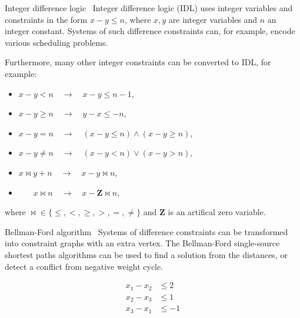\documentclass{beamer}
\begin{document}
\begin{frame}[fragile,t]
\begin{columns}[t,onlytextwidth]
\begin{column}{0.485\textwidth}
		\begin{block}{Integer difference logic~\cite{slides}}
			Integer difference logic (IDL) uses integer variables and constraints in the form $x - y \leq n$, where $x, y$ are integer variables and $n$ an integer constant. Systems of such difference constraints can, for example, encode various scheduling problems.
			
			Furthermore, many other integer constraints can be converted to IDL, for example:
			\begin{itemize}
				\item $x - y < n \quad\to\quad x - y \leq n - 1$,
				\item $x - y \geq n \quad\to\quad y - x \leq -n$,
				\item $x - y = n \quad\to\quad (x - y \leq n) \land (x - y \geq n)$,
				\item $x - y \neq n \quad\to\quad (x - y < n) \lor (x - y > n)$,
				\item $x \bowtie y + n \quad\to\quad x - y \bowtie n$,
				\item $\quad\;\;\: x \bowtie n \quad\to\quad x - \mathbf{Z} \bowtie n$,
			\end{itemize}
			where ${\bowtie} \in \{\leq, <, \geq, >, =, \neq\}$ and $\mathbf{Z}$ is an artifical zero variable.
		\end{block}

		\begin{block}{Bellman-Ford algorithm~\cite{CLRS}}
			Systems of difference constraints can be transformed into constraint graphs with an extra vertex. The Bellman-Ford single-source shortest paths algorithms can be used to find a solution from the distances, or detect a conflict from negative weight cycle.

			\begin{figure}[h]
				\centering
				\begin{subfigure}{0.3\linewidth}
					\centering
					\begin{align*}
						x_1 - x_2 &\leq 2 \\
						x_2 - x_3 &\leq 1 \\
						x_3 - x_1 &\leq -1 \\
					\end{align*}
				\end{subfigure}
				~
				\begin{subfigure}{0.5\linewidth}
					\centering
\end{subfigure}
\end{figure}
\end{block}
\end{column}
\end{columns}
\end{frame}
\end{document}
